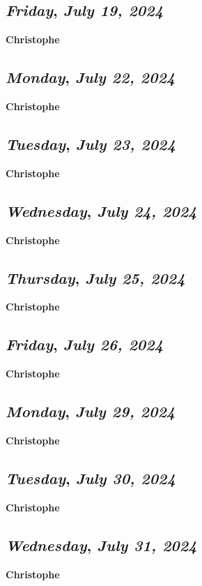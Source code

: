 \def\day{\textit{July 19, 2024}}
\def\weekday{\textit{Friday}}
\subsection*{\weekday, \day}
\textbf {Christophe}


\def\day{\textit{July 22, 2024}}
\def\weekday{\textit{Monday}}
\subsection*{\weekday, \day}
\textbf {Christophe}

\def\day{\textit{July 23, 2024}}
\def\weekday{\textit{Tuesday}}
\subsection*{\weekday, \day}
\textbf {Christophe}

\def\day{\textit{July 24, 2024}}
\def\weekday{\textit{Wednesday}}
\subsection*{\weekday, \day}
\textbf {Christophe}

\def\day{\textit{July 25, 2024}}
\def\weekday{\textit{Thursday}}
\subsection*{\weekday, \day}
\textbf {Christophe}

\def\day{\textit{July 26, 2024}}
\def\weekday{\textit{Friday}}
\subsection*{\weekday, \day}
\textbf {Christophe}



\def\day{\textit{July 29, 2024}}
\def\weekday{\textit{Monday}}
\subsection*{\weekday, \day}
\textbf {Christophe}

\def\day{\textit{July 30, 2024}}
\def\weekday{\textit{Tuesday}}
\subsection*{\weekday, \day}
\textbf {Christophe}

\def\day{\textit{July 31, 2024}}
\def\weekday{\textit{Wednesday}}
\subsection*{\weekday, \day}
\textbf {Christophe}
